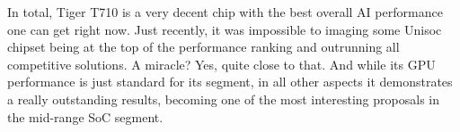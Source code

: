 In total, Tiger T710 is a very decent chip with the best overall AI performance one can get right now. Just recently, it was impossible to imaging some Unisoc chipset being at the top of the performance ranking and outrunning all competitive solutions. A miracle? Yes, quite close to that. And while its GPU performance is just standard for its segment, in all other aspects it demonstrates a really outstanding results, becoming one of the most interesting proposals in the mid-range SoC segment. 